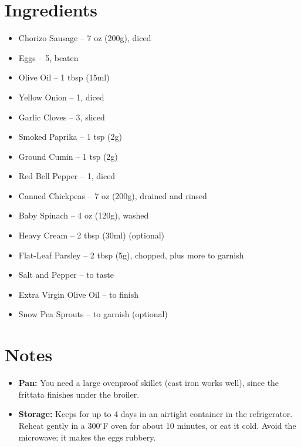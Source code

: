 




\section*{Ingredients}

\begin{itemize}
      \item[\cut] Chorizo Sausage – 7 oz (200g), diced
      \item Eggs – 5, beaten
      \item[\measure] Olive Oil – 1 tbsp (15ml)
      \item[\cut] Yellow Onion – 1, diced
      \item[\cut] Garlic Cloves – 3, sliced
      \item[\measure] Smoked Paprika – 1 tsp (2g)
      \item[\measure] Ground Cumin – 1 tsp (2g)
      \item[\cut] Red Bell Pepper – 1, diced
      \item Canned Chickpeas – 7 oz (200g), drained and rinsed
      \item Baby Spinach – 4 oz (120g), washed
      \item[\measure] Heavy Cream – 2 tbsp (30ml) (optional)
      \item[\cut] Flat-Leaf Parsley – 2 tbsp (5g), chopped, plus more to garnish
      \item Salt and Pepper – to taste
      \item Extra Virgin Olive Oil – to finish
      \item Snow Pea Sprouts – to garnish (optional)
\end{itemize}

\section*{Notes}

\begin{itemize}
      \item \textbf{Pan:} You need a large ovenproof skillet (cast iron works well), since the frittata finishes under the broiler.
      \item \textbf{Storage:} Keeps for up to 4 days in an airtight container in the refrigerator. Reheat gently in a 300$^\circ$F oven for about 10 minutes, or eat it cold. Avoid the microwave; it makes the eggs rubbery.
\end{itemize}


